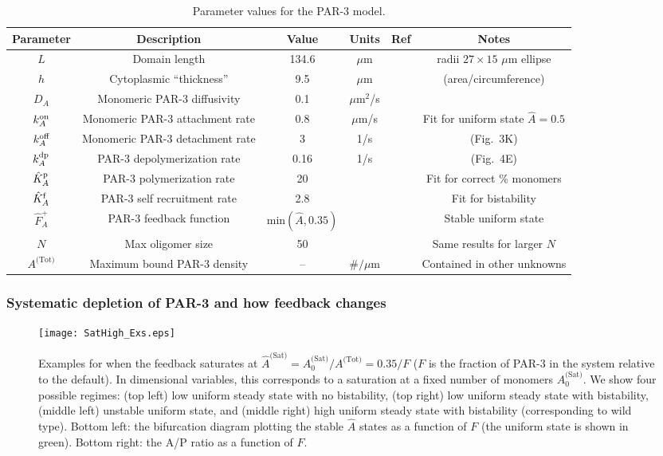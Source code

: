 \documentclass[11pt]{article}
\newcommand{\6}[1]{#1_{\text{6}}}
\newcommand{\3}[1]{#1_{\text{3}}}
\newcommand{\Tot}[1]{#1^\text{(Tot)}}
\newcommand{\Sat}[1]{#1^\text{(Sat)}}
\newcommand{\A}[1]{#1_A}
\begin{document}
\begin{table}
\begin{small}
\centering
\begin{tabular}{|c|c|c|c|c|c|}\hline
Parameter & Description & Value & Units & Ref & Notes \\ \hline
$L$ & Domain length & 134.6 & $\mu$m &  \cite{goehring2011polarization} & radii $27 \times 15$ $\mu$m ellipse\\
$h$ & Cytoplasmic ``thickness'' & 9.5 & $\mu$m &  \cite{goehring2011polarization}  &  (area/circumference)\\ \hline
$\A{D} $ & Monomeric PAR-3 diffusivity & 0.1 & $\mu$m$^2$/s & \cite{lang2023oligomerization} & \\
$\A{\kon}$ & Monomeric PAR-3 attachment rate & 0.8& $\mu$m/s & & Fit for uniform state $\hat A=0.5$ \\
$k^\text{off}_{A}$ & Monomeric PAR-3 detachment rate &  3& 1/s & \cite{lang2023oligomerization} & (Fig.\ 3K)\\
$\A{\kdp}$ & PAR-3 depolymerization rate & 0.16 & 1/s & \cite{lang2023oligomerization} & (Fig.\ 4E) \\
$\hat{K}^\text{p}_A$ & PAR-3 polymerization rate & 20 & & & Fit for correct \% monomers \cite{lang2023oligomerization}  \\
$\hat{K}^\text{f}_A$ & PAR-3 self recruitment rate &2.8 & & & Fit for bistability\\
$\hat F_A^+$ & PAR-3 feedback function &$\text{min}\left(\hat A,0.35\right)$ &  &\cite{lang2022oligomerization} &  Stable uniform state\\
$N$ & Max oligomer size & 50 & & & Same results for larger $N$\\
$\Tot{A}$ & Maximum bound PAR-3 density & -- & $\#/\mu$m & & Contained in other unknowns \\ \hline
\end{tabular}
\caption{\label{tab:paramsP3}Parameter values for the PAR-3 model. }
\end{small}
\end{table}

\subsubsection{Systematic depletion of PAR-3 and how feedback changes \label{sec:howFB}}
\begin{figure}
\centering
\texttt{[image: SatHigh\_Exs.eps]}
\caption{\label{fig:SatHighEx}Examples for when the feedback saturates at $\Sat{\hat A}=\Sat{A}_0/\Tot{A}=0.35/F$ ($F$ is the fraction of PAR-3 in the system relative to the default). In dimensional variables, this corresponds to a saturation at a fixed number of monomers $\Sat{A}_0$. We show four possible regimes: (top left) low uniform steady state with no bistability, (top right) low uniform steady state with bistability, (middle left) unstable uniform state, and (middle right) high uniform steady state with bistability (corresponding to wild type). Bottom left: the bifurcation diagram plotting the stable $\hat A$ states as a function of $F$ (the uniform state is shown in green). Bottom right: the A/P ratio as a function of $F$.}
\end{figure}
\end{document}
